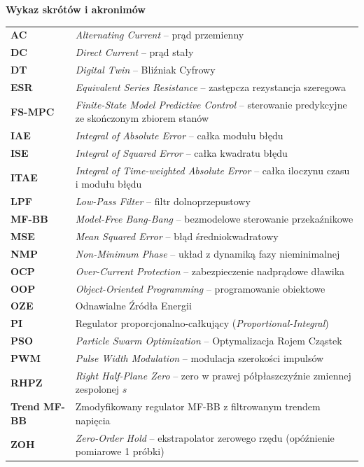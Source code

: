 \flushleft

\textbf{\large Wykaz skrótów i akronimów}
\vspace{0.8em}

\begin{tabular}{ll}
    \textbf{AC} & \emph{Alternating Current} -- prąd przemienny \\
    \textbf{DC} & \emph{Direct Current} -- prąd stały \\
    \textbf{DT} & \emph{Digital Twin} -- Bliźniak Cyfrowy \\
    \textbf{ESR} & \emph{Equivalent Series Resistance} -- zastępcza rezystancja szeregowa \\
    \textbf{FS-MPC} & \emph{Finite-State Model Predictive Control} -- sterowanie predykcyjne ze skończonym zbiorem stanów \\
    \textbf{IAE} & \emph{Integral of Absolute Error} -- całka modułu błędu \\
    \textbf{ISE} & \emph{Integral of Squared Error} -- całka kwadratu błędu \\
    \textbf{ITAE} & \emph{Integral of Time-weighted Absolute Error} -- całka iloczynu czasu i modułu błędu \\
    \textbf{LPF} & \emph{Low-Pass Filter} -- filtr dolnoprzepustowy \\
    \textbf{MF-BB} & \emph{Model-Free Bang-Bang} -- bezmodelowe sterowanie przekaźnikowe \\
    \textbf{MSE} & \emph{Mean Squared Error} -- błąd średniokwadratowy \\
    \textbf{NMP} & \emph{Non-Minimum Phase} -- układ z dynamiką fazy nieminimalnej \\
    \textbf{OCP} & \emph{Over-Current Protection} -- zabezpieczenie nadprądowe dławika \\
    \textbf{OOP} & \emph{Object-Oriented Programming} -- programowanie obiektowe \\
    \textbf{OZE} & Odnawialne Źródła Energii \\
    \textbf{PI} & Regulator proporcjonalno-całkujący (\emph{Proportional-Integral}) \\
    \textbf{PSO} & \emph{Particle Swarm Optimization} -- Optymalizacja Rojem Cząstek \\
    \textbf{PWM} & \emph{Pulse Width Modulation} -- modulacja szerokości impulsów \\
    \textbf{RHPZ} & \emph{Right Half-Plane Zero} -- zero w prawej półpłaszczyźnie zmiennej zespolonej $s$ \\
    \textbf{Trend MF-BB} & Zmodyfikowany regulator MF-BB z filtrowanym trendem napięcia \\
    \textbf{ZOH} & \emph{Zero-Order Hold} -- ekstrapolator zerowego rzędu (opóźnienie pomiarowe 1 próbki) \\
\end{tabular}

